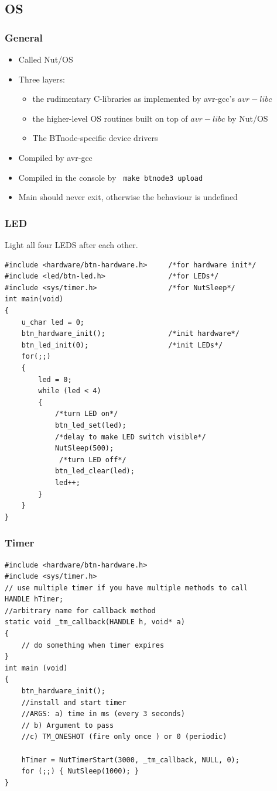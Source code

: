\subsection{OS}

\subsubsection{General}

\begin{itemize}[noitemsep]
\item Called Nut/OS
\item Three layers:
		\begin{itemize}
		\item the rudimentary C-libraries as implemented by avr-gcc’s $avr-libc$
		\item the higher-level OS routines built on top of $avr-libc$ by Nut/OS
		\item The BTnode-specific device drivers
		\end{itemize}
\item Compiled by avr-gcc
\item Compiled in the console by \texttt{ make btnode3 upload }
\item Main should never exit, otherwise the behaviour is undefined
\end{itemize}

\subsubsection{LED}
Light all four LEDS after each other.
\begin{lstlisting}[basicstyle=\small]
#include <hardware/btn-hardware.h>     /*for hardware init*/
#include <led/btn-led.h>               /*for LEDs*/
#include <sys/timer.h>                 /*for NutSleep*/
int main(void)
{
	u_char led = 0;
	btn_hardware_init();               /*init hardware*/
	btn_led_init(0);                   /*init LEDs*/
	for(;;)
	{
		led = 0;
		while (led < 4)
		{
			/*turn LED on*/
			btn_led_set(led);
			/*delay to make LED switch visible*/
			NutSleep(500);
			 /*turn LED off*/
			btn_led_clear(led);
			led++;
		}
	}
}
\end{lstlisting}


\subsubsection{Timer}

\begin{lstlisting}[basicstyle=\small]
#include <hardware/btn-hardware.h>
#include <sys/timer.h>
// use multiple timer if you have multiple methods to call
HANDLE hTimer; 
//arbitrary name for callback method
static void _tm_callback(HANDLE h, void* a)
{
	// do something when timer expires
}
int main (void)
{
	btn_hardware_init();
	//install and start timer
	//ARGS: a) time in ms (every 3 seconds)
	// b) Argument to pass
	//c) TM_ONESHOT (fire only once ) or 0 (periodic)
	
	hTimer = NutTimerStart(3000, _tm_callback, NULL, 0);
	for (;;) { NutSleep(1000); }
}

\end{lstlisting}

